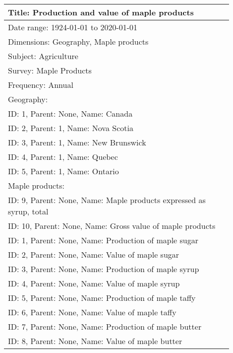 \documentclass[11pt]{article}
\begin{document}
\begin{table*}[h]
    \small
    \centering
    \begin{tabular}{p{0.9\linewidth}}

\toprule

Title: Production and value of maple products\\

\midrule

Date range: 1924-01-01 to 2020-01-01\\
Dimensions: Geography, Maple products\\
Subject: Agriculture\\
Survey: Maple Products\\
Frequency: Annual\\

\midrule

Geography:\\
ID: 1, Parent: None, Name: Canada\\
ID: 2, Parent: 1, Name: Nova Scotia\\
ID: 3, Parent: 1, Name: New Brunswick\\
ID: 4, Parent: 1, Name: Quebec\\
ID: 5, Parent: 1, Name: Ontario\\
Maple products:\\
ID: 9, Parent: None, Name: Maple products expressed as syrup, total\\
ID: 10, Parent: None, Name: Gross value of maple products\\
ID: 1, Parent: None, Name: Production of maple sugar\\
ID: 2, Parent: None, Name: Value of maple sugar\\
ID: 3, Parent: None, Name: Production of maple syrup\\
ID: 4, Parent: None, Name: Value of maple syrup\\
ID: 5, Parent: None, Name: Production of maple taffy\\
ID: 6, Parent: None, Name: Value of maple taffy\\
ID: 7, Parent: None, Name: Production of maple butter\\
ID: 8, Parent: None, Name: Value of maple butter\\

\midrule


\end{tabular}
\end{table*}
\end{document}
